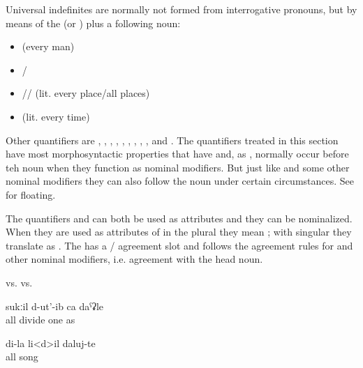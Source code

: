 Universal indefinites are normally not formed from interrogative pronouns, but by means of the    (or  ) plus a following noun:

\begin{itemize}
	\item	{}  (every man)
	\item	{}\slash{} 
	\item	{}\slash{}\slash{}  (lit. every place\slash all places)
	\item	{}  (lit. every time)
\end{itemize}
%

Other quantifiers are ,  , , , ,  , , ,  , and  . The quantifiers treated in this section have most morphosyntactic properties that  have and, as , normally occur before teh noun when they function as nominal modifiers. But just like  and some other nominal modifiers they can also follow the noun under certain circumstances. See  for  floating. 

The quantifiers  and  can both be used as attributes and they can be nominalized. When they are used as attributes of  in the plural they mean ; with singular  they translate as . The   has a / agreement slot and follows the agreement rules for  and other nominal modifiers, i.e. agreement with the head noun.

\begin{exe}
	\ex	\label{ex:all girls all houses}
	\begin{xlist}
		\TabPositions{10.5em,12.5em}
		\ex	{} 		\tab	vs.	\tab	{} 
		\ex	{}		\tab	vs.	\tab	{} 
	\end{xlist}

	\ex	\label{ex:He divided all (the bread) like one (i.e. everyone got the same amount of bread)}
	\gll	sukːil	d-ut'-ib	ca	daˁʡle\\
		all	divide	one	as\\
	\glt	{}

	\ex	
	\gll	di-la	li<d>il	daluj-te\\
			all	song\\
	\glt	{}
\end{exe}

